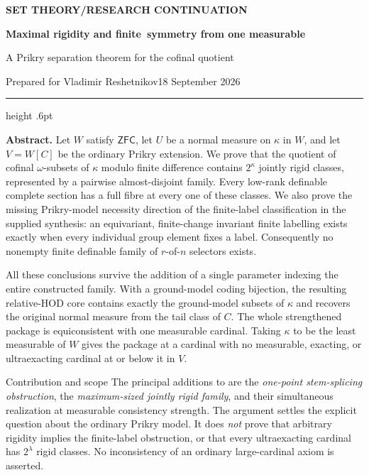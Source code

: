 \documentclass[11pt,letterpaper]{article}
\theoremstyle{definition}
\numberwithin{equation}{section}
\newcommand{\ZFC}{\mathsf{ZFC}}
\begin{document}
\thispagestyle{empty}
{\sffamily\bfseries\small\color{Olive}SET THEORY\quad /\quad RESEARCH CONTINUATION}
\vspace{13pt}

{\fontsize{28}{31}\selectfont\bfseries\color{Forest}Maximal rigidity and finite\ symmetry from one measurable\par}
\vspace{10pt}
{\fontsize{14}{18}\selectfont A Prikry separation theorem for the cofinal quotient\par}
\vspace{14pt}
{\color{Muted}Prepared for Vladimir Reshetnikov\hfill 18 September 2026\par}
\vspace{3pt}
{\color{Sage}\hrule height .6pt}
\vspace{12pt}

\textbf{Abstract.}
Let $W$ satisfy $\ZFC$, let $U$ be a normal measure on $\kappa$ in $W$, and let $V=W[C]$ be the ordinary Prikry extension. We prove that the quotient of cofinal $\omega$-subsets of $\kappa$ modulo finite difference contains $2^\kappa$ jointly rigid classes, represented by a pairwise almost-disjoint family. Every low-rank definable complete section has a full fibre at every one of these classes. We also prove the missing Prikry-model necessity direction of the finite-label classification in the supplied synthesis: an equivariant, finite-change invariant finite labelling exists exactly when every individual group element fixes a label. Consequently no nonempty finite definable family of $r$-of-$n$ selectors exists.

All these conclusions survive the addition of a single parameter indexing the entire constructed family. With a ground-model coding bijection, the resulting relative-HOD core contains exactly the ground-model subsets of $\kappa$ and recovers the original normal measure from the tail class of $C$. The whole strengthened package is equiconsistent with one measurable cardinal. Taking $\kappa$ to be the least measurable of $W$ gives the package at a cardinal with no measurable, exacting, or ultraexacting cardinal at or below it in $V$.

\begin{assessment}{Contribution and scope}
The principal additions to \cite{synthesis} are the \emph{one-point stem-splicing obstruction}, the \emph{maximum-sized jointly rigid family}, and their simultaneous realization at measurable consistency strength. The argument settles the explicit question about the ordinary Prikry model. It does \emph{not} prove that arbitrary rigidity implies the finite-label obstruction, or that every ultraexacting cardinal has $2^\lambda$ rigid classes. No inconsistency of an ordinary large-cardinal axiom is asserted.
\end{assessment}
\end{document}
